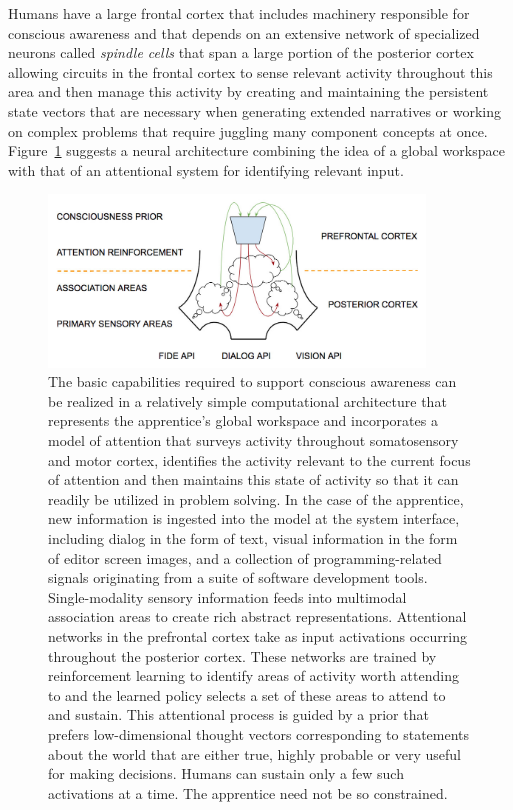 \documentclass[letterpaper,11pt]{article}
\def\urlh#1{{}}
\begin{document}
Humans have a large frontal cortex that includes machinery responsible for conscious awareness and that depends on an extensive network of specialized neurons called {\it{spindle cells}} that span a large portion of the posterior cortex allowing circuits in the frontal cortex to sense relevant activity throughout this area and then manage this activity by creating and maintaining the persistent state vectors that are necessary when generating extended narratives or working on complex problems that require juggling many component concepts at once. Figure~{\urlh{#fig_Global_Workspace_Conscious_Attention}{\ref{fig_conscious}}} suggests a neural architecture combining the idea of a global workspace with that of an attentional system for identifying relevant input.


\begin{figure}
%
  \begin{center} 
    \includegraphics[height=130pt]{./figures/Global_Workspace_Conscious_Attention.jpg} %
  \end{center}
%
  \caption{The basic capabilities required to support conscious awareness can be realized in a relatively simple computational architecture that represents the apprentice's global workspace and incorporates a model of attention that surveys activity throughout somatosensory and motor cortex, identifies the activity relevant to the current focus of attention and then maintains this state of activity so that it can readily be utilized in problem solving.  In the case of the apprentice, new information is ingested into the model at the system interface, including dialog in the form of text, visual information in the form of editor screen images, and a collection of programming-related signals originating from a suite of software development tools. 
%
Single-modality sensory information feeds into multimodal association areas to create rich abstract representations. Attentional networks in the prefrontal cortex take as input activations occurring throughout the posterior cortex. These networks are trained by reinforcement learning to identify areas of activity worth attending to and the learned policy selects a set of these areas to attend to and sustain. This attentional process is guided by a prior that prefers low-dimensional thought vectors corresponding to statements about the world that are either true, highly probable or very useful for making decisions. Humans can sustain only a few such activations at a time. The apprentice need not be so constrained.}
%
  \label{fig_conscious}
%
\end{figure}
\end{document}
